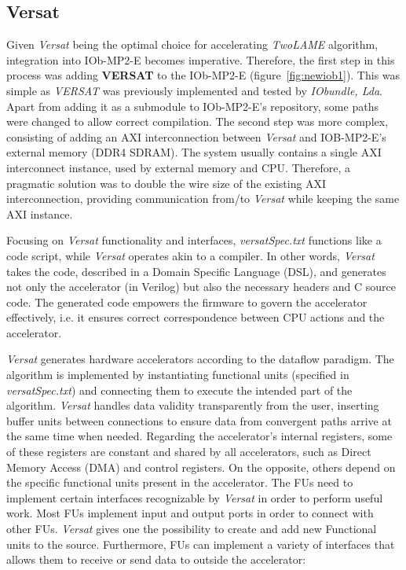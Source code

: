 \subsection{Versat}

Given \textit{Versat} being the optimal choice for accelerating \textit{TwoLAME} algorithm, integration into IOb-MP2-E becomes imperative.
Therefore, the first step in this process was adding \textbf{VERSAT} to the IOb-MP2-E (figure~\ref{fig:newiob1}). This was simple as \textit{VERSAT} was previously implemented and tested by \textit{IObundle, Lda}. Apart from adding it as a submodule to IOb-MP2-E's repository, some paths were changed to allow correct compilation.
The second step was more complex, consisting of adding an AXI interconnection between \textit{Versat} and IOB-MP2-E's external memory (DDR4 SDRAM). The system usually contains a single AXI~\cite{bib:axi_xilinx} interconnect instance, used by external memory and CPU. Therefore, a pragmatic solution was to double the wire size of the existing AXI interconnection, providing communication from/to \textit{Versat} while keeping the same AXI instance.

Focusing on \textit{Versat} functionality and interfaces, \textit{versatSpec.txt} functions like a code script, while \textit{Versat} operates akin to a compiler. In other words, \textit{Versat} takes the code, described in a Domain Specific Language (DSL), and generates not only the accelerator (in Verilog) but also the necessary headers and C source code. The generated code empowers the firmware to govern the accelerator effectively, i.e. it ensures correct correspondence between CPU actions and the accelerator.

\textit{Versat} generates hardware accelerators according to the dataflow paradigm. The algorithm is implemented by instantiating functional units (specified in \textit{versatSpec.txt}) and connecting them to execute the intended part of the algorithm. \textit{Versat} handles data validity transparently from the user, inserting buffer units between connections to ensure data from convergent paths arrive at the same time when needed.
Regarding the accelerator's internal registers, some of these registers are constant and shared by all accelerators, such as Direct Memory Access (DMA) and control registers. On the opposite, others depend on the specific functional units present in the accelerator.
The FUs need to implement certain interfaces recognizable by \textit{Versat} in order to perform useful work. Most FUs implement input and output ports in order to connect with other FUs. \textit{Versat} gives one the possibility to create and add new Functional units to the source. Furthermore, FUs can implement a variety of interfaces that allows them to receive or send data to outside the accelerator:


